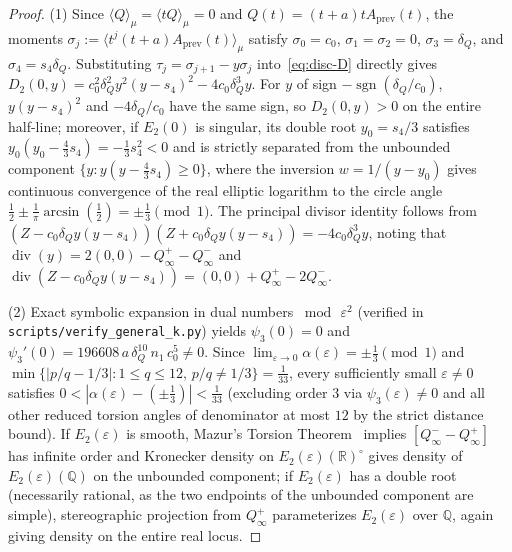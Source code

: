 \documentclass[11pt,a4paper]{article}
\theoremstyle{definition}
\theoremstyle{remark}
\newcommand{\QQ}{\mathbb{Q}}
\newcommand{\RR}{\mathbb{R}}
\begin{document}
\begin{proof}
(1) Since $\langle Q \rangle_\mu = \langle t Q \rangle_\mu = 0$ and $Q(t) = (t + a) t A_{\mathrm{prev}}(t)$, the moments $\sigma_j := \langle t^j (t + a) A_{\mathrm{prev}}(t) \rangle_\mu$ satisfy $\sigma_0 = c_0$, $\sigma_1 = \sigma_2 = 0$, $\sigma_3 = \delta_Q$, and $\sigma_4 = s_4 \delta_Q$. Substituting $\tau_j = \sigma_{j+1} - y \sigma_j$ into~\eqref{eq:disc-D} directly gives $D_2(0, y) = c_0^2 \delta_Q^2 y^2 (y - s_4)^2 - 4 c_0 \delta_Q^3 y$. For $y$ of sign $-\operatorname{sgn}(\delta_Q / c_0)$, $y(y - s_4)^2$ and $-4 \delta_Q / c_0$ have the same sign, so $D_2(0, y) > 0$ on the entire half-line; moreover, if $E_2(0)$ is singular, its double root $y_0 = s_4 / 3$ satisfies $y_0 (y_0 - \frac{4}{3} s_4) = -\frac{1}{3} s_4^2 < 0$ and is strictly separated from the unbounded component $\{y : y(y - \frac{4}{3} s_4) \ge 0\}$, where the inversion $w = 1/(y - y_0)$ gives continuous convergence of the real elliptic logarithm to the circle angle $\frac{1}{2} \pm \frac{1}{\pi}\arcsin(\frac{1}{2}) = \pm \frac{1}{3} \pmod{1}$. The principal divisor identity follows from $(Z - c_0 \delta_Q y(y - s_4))(Z + c_0 \delta_Q y(y - s_4)) = -4 c_0 \delta_Q^3 y$, noting that $\operatorname{div}(y) = 2(0, 0) - Q_\infty^+ - Q_\infty^-$ and $\operatorname{div}(Z - c_0 \delta_Q y(y - s_4)) = (0, 0) + Q_\infty^+ - 2 Q_\infty^-$.

(2) Exact symbolic expansion in dual numbers $\bmod\,\varepsilon^2$ (verified in \texttt{scripts/verify\_general\_k.py}) yields $\psi_3(0) = 0$ and $\psi_3'(0) = 196608\, a \, \delta_Q^{10} \, n_1 \, c_0^5 \neq 0$. Since $\lim_{\varepsilon \to 0} \alpha(\varepsilon) = \pm \frac{1}{3} \pmod{1}$ and $\min\{|p/q - 1/3| : 1 \le q \le 12,\, p/q \neq 1/3\} = \frac{1}{33}$, every sufficiently small $\varepsilon \neq 0$ satisfies $0 < |\alpha(\varepsilon) - (\pm \frac{1}{3})| < \frac{1}{33}$ (excluding order $3$ via $\psi_3(\varepsilon) \neq 0$ and all other reduced torsion angles of denominator at most $12$ by the strict distance bound). If $E_2(\varepsilon)$ is smooth, Mazur's Torsion Theorem~\cite{Mazur1977} implies $[Q_\infty^- - Q_\infty^+]$ has infinite order and Kronecker density on $E_2(\varepsilon)(\RR)^\circ$ gives density of $E_2(\varepsilon)(\QQ)$ on the unbounded component; if $E_2(\varepsilon)$ has a double root (necessarily rational, as the two endpoints of the unbounded component are simple), stereographic projection from $Q_\infty^+$ parameterizes $E_2(\varepsilon)$ over $\QQ$, again giving density on the entire real locus.


\end{proof}
\end{document}
